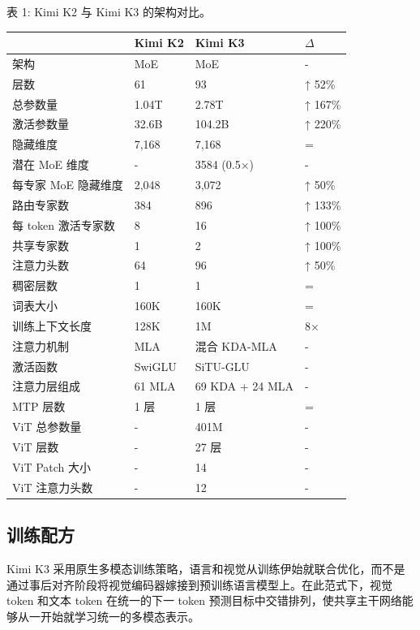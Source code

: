 \documentclass[
  10
]{article}
\newcounter{none} %
\begin{document}
表 1: Kimi K2 与 Kimi K3 的架构对比。

{\def\LTcaptype{none} %
\begin{longtable}[]{@{}|l|l|l|l|@{}}
\toprule\noalign{}
\endhead
\bottomrule\noalign{}
\endlastfoot
\hline
& Kimi K2 & Kimi K3 & $\Delta$ \\
\hline
架构 & MoE & MoE & - \\
\hline
层数 & 61 & 93 & ↑ 52\% \\
\hline
总参数量 & 1.04T & 2.78T & ↑ 167\% \\
\hline
激活参数量 & 32.6B & 104.2B & ↑ 220\% \\
\hline
隐藏维度 & 7,168 & 7,168 & = \\
\hline
潜在 MoE 维度 & - & 3584 (0.5$\times$) & - \\
\hline
每专家 MoE 隐藏维度 & 2,048 & 3,072 & ↑ 50\% \\
\hline
路由专家数 & 384 & 896 & ↑ 133\% \\
\hline
每 token 激活专家数 & 8 & 16 & ↑ 100\% \\
\hline
共享专家数 & 1 & 2 & ↑ 100\% \\
\hline
注意力头数 & 64 & 96 & ↑ 50\% \\
\hline
稠密层数 & 1 & 1 & = \\
\hline
词表大小 & 160K & 160K & = \\
\hline
训练上下文长度 & 128K & 1M & 8$\times$ \\
\hline
注意力机制 & MLA & 混合 KDA-MLA & - \\
\hline
激活函数 & SwiGLU & SiTU-GLU & - \\
\hline
注意力层组成 & 61 MLA & 69 KDA + 24 MLA & - \\
\hline
MTP 层数 & 1 层 & 1 层 & = \\
\hline
ViT 总参数量 & - & 401M & - \\
\hline
ViT 层数 & - & 27 层 & - \\
\hline
ViT Patch 大小 & - & 14 & - \\
\hline
ViT 注意力头数 & - & 12 & - \\
\hline
\end{longtable}
}

\subsection{训练配方}\label{training-recipe}

Kimi K3 采用原生多模态训练策略，语言和视觉从训练伊始就联合优化，而不是通过事后对齐阶段将视觉编码器嫁接到预训练语言模型上。在此范式下，视觉 token 和文本 token 在统一的下一 token 预测目标中交错排列，使共享主干网络能够从一开始就学习统一的多模态表示。
\end{document}
